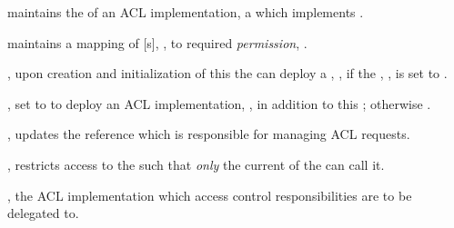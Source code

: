 \begin{state}
  \begin{public}
  \item {} maintains the  of an ACL
    implementation, a  which implements .

  \item {} maintains a
    mapping of [s], , to required
    \emph{permission}, .
  \end{public}
\end{state}

\begin{code}
  \begin{constructor}
  \item {}, upon creation and initialization
    of this  the  can deploy a
    , , if the , , is set to .

    \begin{parameters}
    \item {}, set to  to deploy an ACL
      implementation, , in addition to this
      ; otherwise .
    \end{parameters}
  \end{constructor}

  \begin{functions}
  \item {}, updates the
     reference which is responsible for managing ACL requests.

    \begin{modifiers}
    \item {}, restricts access to the
       such that \emph{only} the current  of the
       can call it.
    \end{modifiers}

    \begin{parameters}
    \item {}, the ACL implementation which access
      control responsibilities are to be delegated to.
    \end{parameters}


\end{functions}
\end{code}
